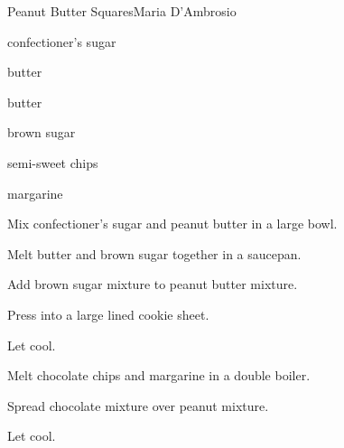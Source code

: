 \begin{recipe}{Peanut Butter Squares}{Maria D'Ambrosio}{}

\begin{ingredients}
\item {} confectioner's sugar
\item {}  butter
\item \lbs{\half} butter
\item {} brown sugar
\item {} semi-sweet  chips
\item {} margarine
\end{ingredients}

\begin{directions}
\item Mix confectioner's sugar and peanut butter in a large bowl.
\item Melt butter and brown sugar together in a saucepan.
\item Add brown sugar mixture to peanut butter mixture.
\item Press into a large lined cookie sheet.
\item Let cool.
\item Melt chocolate chips and margarine in a double boiler.
\item Spread chocolate mixture over peanut mixture.
\item Let cool.
\end{directions}

\end{recipe}
